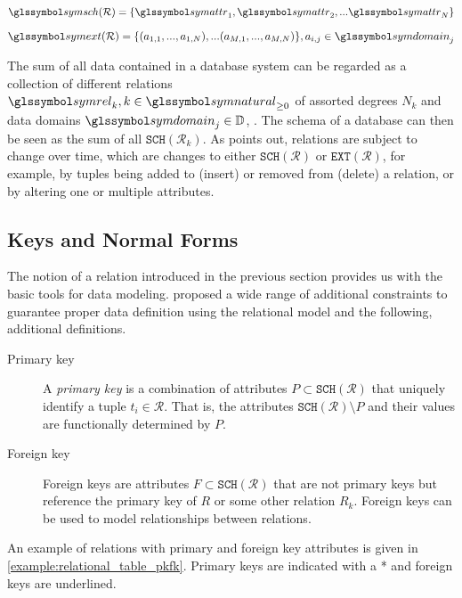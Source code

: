 \begin{equation}
    \symsch(\mathcal{R}) = \lbrace \symattr_1, \symattr_2, ... \symattr_N \rbrace
\end{equation}

\begin{equation}
    \symext(\mathcal{R}) = \lbrace (a_{1,1}, ..., a_{1,N}), ... (a_{M,1}, ..., a_{M,N})\rbrace, a_{i,j} \in \symdomain_j 
\end{equation}

The sum of all data contained in a database system can be regarded as a collection of different relations $\symrel_k, k \in \symnatural_{\geq 0}$ of assorted degrees $N_k$ and data domains $\symdomain_j \in \mathbb{D}$, . The schema of a database can then be seen as the sum of all $\mathtt{SCH}(\mathcal{R}_k)$. As \cite{Codd:1970Relational} points out, relations are subject to change over time, which are changes to either $\mathtt{SCH}(\mathcal{R})$ or $\mathtt{EXT}(\mathcal{R})$, for example, by tuples being added to (insert) or removed from (delete) a relation, or by altering one or multiple attributes.


\subsection{Keys and Normal Forms}

The notion of a relation introduced in the previous section provides us with the basic tools for data modeling. \cite{Codd:1970Relational} proposed a wide range of additional constraints to guarantee proper data definition using the relational model and the following, additional definitions. 

\begin{description}
    \item[Primary key] A \emph{primary key} is a combination of attributes $P \subset \mathtt{SCH}(\mathcal{R})$ that uniquely identify a tuple $t_i \in \mathcal{R}$. That is, the attributes $\mathtt{SCH}(\mathcal{R}) \setminus P$ and their values are functionally determined by $P$.
    \item[Foreign key] Foreign keys are attributes $F \subset \mathtt{SCH}(\mathcal{R})$ that are not primary keys but reference the primary key of $R$ or some other relation $R_k$. Foreign keys can be used to model relationships between relations.
\end{description}

An example of relations with primary and foreign key attributes is given in \cref{example:relational_table_pkfk}. Primary keys are indicated with a * and foreign keys are underlined.

